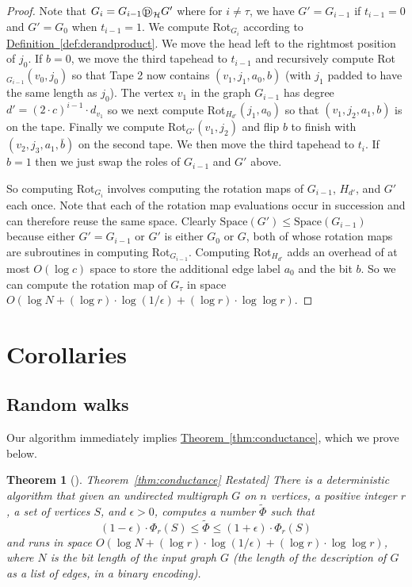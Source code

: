 \documentclass[11pt]{article}
\numberwithin{equation}{section}
\theoremstyle{definition}
\theoremstyle{plain}
\newcommand{\expref}[2]{\hyperref[#2]{#1~\ref{#2}}}
\newcommand{\wt}{\widetilde}   %
\newcommand{\SC}{O(\log N + (\log r)\cdot\log(1/\epsilon)+(\log r)\cdot \log\log r)}
\newcommand{\dpr}{\text{\textcircled{p}}_{\mathcal{H}}}
\newcommand{\Space}{\mathrm{Space}}
\numberwithin{myalgctr}{section}
\theoremstyle{named}
\newtheorem{namedtheorem}{Theorem}[section]
\begin{document}
\begin{proof}
Note that $G_i=G_{i-1}\dpr G'$ where for $i\neq \tau$, we have $G'=G_{i-1}$ if $t_{i-1}=0$ and $G'=G_{0}$ when $t_{i-1}=1$. We compute Rot$_{G_i}$ according to \expref{Definition}{def:derandproduct}. We move the head left to the rightmost position of $j_0$. If $b=0$, we move the third tapehead to $t_{i-1}$ and recursively compute Rot$_{G_{i-1}}(v_0,j_0)$ so that Tape 2 now contains $(v_1,j_1,a_0, b)$ (with $j_1$ padded to have the same length as $j_0$). The vertex $v_1$ in the graph $G_{i-1}$ has degree $d'=(2\cdot c)^{i-1}\cdot d_{v_1}$ so we next compute Rot$_{H_{d'}}(j_1,a_0)$ so that $(v_1, j_2, a_1, b)$ is on the tape. Finally we compute Rot$_{G'}(v_1,j_2)$ and flip $b$ to finish with $(v_2,j_3,a_1, \bar{b})$ on the second tape. We then move the third tapehead to $t_i$. If $b=1$ then we just swap the roles of $G_{i-1}$ and $G'$ above.  

So computing Rot$_{G_i}$ involves computing the rotation maps of $G_{i-1}$, $H_{d'}$, and $G'$ each once. Note that each of the rotation map evaluations occur in succession and can therefore reuse the same space. Clearly $\Space(G')\leq \Space(G_{i-1})$ because either $G'=G_{i-1}$ or $G'$ is either $G_0$ or $G$, both of whose rotation maps are subroutines in computing Rot$_{G_{i-1}}$. Computing Rot$_{H_{d'}}$ adds an overhead of at most $O(\log c)$ space to store the additional edge label $a_0$ and the bit $b$. So we can compute the rotation map of $G_\tau$ in space $\SC$. 
\end{proof}


\section{Corollaries}
\label{sect:cors}
%
\subsection{Random walks}
Our algorithm immediately implies \expref{Theorem}{thm:conductance}, which we prove below. 

\begin{namedtheorem}[\expref{Theorem}{thm:conductance} Restated]
There is a deterministic algorithm that given an undirected multigraph $G$ on $n$ vertices, a positive integer $r$, a set of vertices $S$, and $\epsilon>0$, computes a number $\wt{\Phi}$ such that
\[
(1-\epsilon)\cdot \Phi_r(S) \leq \wt{\Phi} \leq (1+\epsilon)\cdot \Phi_r(S)
\]
and runs in space $\SC$, where $N$ is the bit length of the input graph $G$ (the length of the description of $G$ as a list of edges, in a binary encoding). 
\end{namedtheorem}
\end{document}

